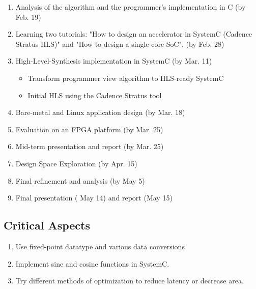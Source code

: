 \vspace{-0.1in}
\begin{enumerate}
\setlength\itemsep{-0.15em}

\item Analysis of the algorithm and the programmer's implementation in C (by
  Feb. 19)

\item Learning two tutorials: "How to design an accelerator in SystemC
    (Cadence Stratus HLS)" and "How to design a single-core
    SoC"\cite{esp1}\cite{esp2}. (by Feb. 28)

\item High-Level-Synthesis implementation in SystemC (by Mar. 11)

  \vspace{-2mm}
       \begin{itemize}
            \item Transform programmer view algorithm to HLS-ready SystemC
            \item Initial HLS using the Cadence Stratus tool
       \end{itemize}

\item Bare-metal and Linux application design (by Mar. 18)  

\item Evaluation on an FPGA platform (by Mar. 25)

\item Mid-term presentation and report (by Mar. 25)

\item Design Space Exploration (by Apr. 15)

\item Final refinement and analysis (by May 5)

\item Final presentation ( May 14) and report (May 15)

\end{enumerate}

\subsection{Critical Aspects}
\begin{enumerate}
\setlength\itemsep{-0.15em}

\item Use fixed-point datatype and various data conversions

\item Implement sine and cosine functions in SystemC.

\item Try different methods of optimization to reduce latency or decrease area.

\end{enumerate}

